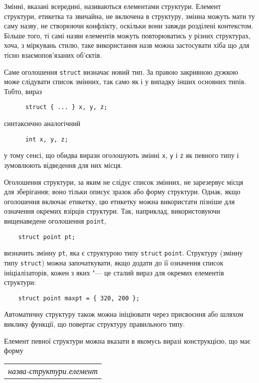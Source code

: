\documentclass[a4paper,12pt]{book}
\begin{document}
  Змінні, вказані всередині, називаються елементами структури. Елемент структури,
  етикетка та звичайна, не включена в структуру, змінна можуть мати ту саму назву, не
  створюючи конфлікту, оскільки вони завжди розділені контекстом. Більше того, ті самі
  назви елементів можуть повторюватись у різних структурах, хоча, з міркувань стилю, таке
  використання назв можна застосувати хіба що для тісно взаємопов'язаних
  об'єктів.

  Саме оголошення \texttt{struct} визначає новий тип. За правою закривною дужкою може
  слідувати список змінних, так само як і у випадку інших основних типів. Тобто, вираз
  \begin{verbatim}
      struct { ... } x, y, z;
  \end{verbatim}
  синтаксично аналогічний
  \begin{verbatim}
      int x, y, z;
  \end{verbatim}
  у тому сенсі, що обидва вирази оголошують змінні \texttt{x}, \texttt{y} і \texttt{z} як
  певного типу і зумовлюють відведення для них місця.

  Оголошення структури, за яким не слідує список змінних, не зарезервує місця для
  зберігання; воно тільки описує зразок або форму структури. Однак, якщо оголошення
  включає етикетку, цю етикетку можна використати пізніше для означення окремих взірців
  структури. Так, наприклад, використовуючи вищенаведене оголошення
  \texttt{point},
  \begin{verbatim}
    struct point pt;
  \end{verbatim}
  визначить змінну \texttt{pt}, яка є структурою типу \texttt{struct}
  \texttt{point}. Структуру (змінну типу \texttt{struct}) можна започаткувати, якщо додати
  до її означення список ініціалізаторів, кожен з яких "--- це сталий вираз для окремих
  елементів структури:
  \begin{verbatim}
    struct point maxpt = { 320, 200 };
  \end{verbatim}

  Автоматичну структуру також можна ініціювати через присвоєння або шляхом виклику
  функції, що повертає структуру правильного типу.

  Елемент певної структури можна вказати в якомусь виразі конструкцією, що має
  форму

  \vspace{12pt}
  \begin{tabular}{l}
  \textit{назва-структури.елемент}
  \end{tabular}
  \vspace{12pt}
\end{document}
